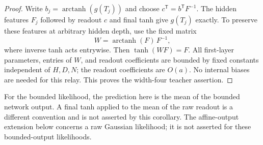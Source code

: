 \begin{proof}
Write $b_j=\operatorname{arctanh}(g(T_j))$ and choose $c^{\mathsf T}=b^{\mathsf T}F^{-1}$. The hidden features $F_j$ followed by readout $c$ and final tanh give $g(T_j)$ exactly. To preserve these features at arbitrary hidden depth, use the fixed matrix
\[
 W=\operatorname{arctanh}(F)\,F^{-1},
\]
where inverse tanh acts entrywise. Then $\tanh(WF)=F$. All first-layer parameters, entries of $W$, and readout coefficients are bounded by fixed constants independent of $H,D,N$; the readout coefficients are $O(a)$. No internal biases are needed for this relay. This proves the width-four teacher assertion.
\end{proof}

For the bounded likelihood, the prediction here is the mean of the bounded network output. A final tanh applied to the mean of the raw readout is a different convention and is not asserted by this corollary. The affine-output extension below concerns a raw Gaussian likelihood; it is not asserted for these bounded-output likelihoods.

